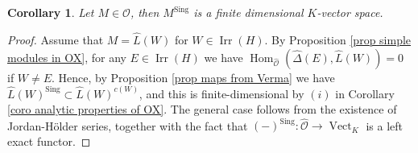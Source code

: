 \documentclass{amsart}
\newtheorem{coro}[defi]{Corollary}
\newcommand{\Hom}{\operatorname{Hom}}
\newcommand{\OX}{\mathcal{O}}
\begin{document}
\begin{coro}
Let $M\in\widehat{\OX}$, then $M^{\operatorname{Sing}}$ is a finite dimensional $K$-vector space.
\end{coro}
\begin{proof}
Assume that $M=\widehat{L}(W)$ for $W\in \operatorname{Irr}(H)$. By Proposition \ref{prop simple modules in OX}, for any $E\in \operatorname{Irr}(H)$ we have $\Hom_{\widehat{\OX}}(\widehat{\Delta}(E),\widehat{L}(W))=0$ if $W\neq E$. Hence, by Proposition \ref{prop maps from Verma} we have $\widehat{L}(W)^{\operatorname{Sing}}\subset \widehat{L}(W)^{c(W)}$, and this is finite-dimensional by $(i)$ in Corollary \ref{coro analytic properties of OX}. The general case follows from the existence of Jordan-Hölder series, together with the fact that $(-)^{\operatorname{Sing}}:\widehat{\OX}\rightarrow \operatorname{Vect}_K$  is a left exact functor.
\end{proof}
\end{document}
